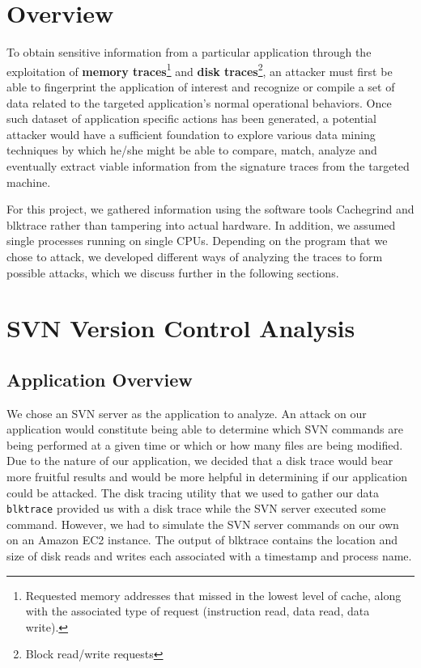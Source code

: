 \documentclass[11pt, oneside]{article}
\begin{document}
\section{Overview}
To obtain sensitive information from a particular application through the 
exploitation of \textbf{memory traces}\footnote{Requested memory addresses 
that missed in the lowest level of cache, along with the associated type of 
request (instruction read, data read, data write).} and 
\textbf{disk traces}\footnote{Block read/write requests}, an attacker must 
first be able to fingerprint the application of interest and recognize or 
compile a set of data related to the targeted application's normal operational 
behaviors. Once such dataset of application specific actions has been 
generated, a potential attacker would have a sufficient foundation to explore 
various data mining techniques by which he/she might be able to compare, 
match, analyze and eventually extract viable information from the signature 
traces from the targeted machine.

For this project, we gathered information using the software tools Cachegrind
and blktrace rather than tampering into actual hardware. In addition, we 
assumed single processes running on single CPUs. Depending on the program that 
we chose to attack, we developed different ways of analyzing the traces to
form possible attacks, which we discuss further in the following sections.


\section{SVN Version Control Analysis}
\subsection{Application Overview}
We chose an SVN server as the application to analyze.  An attack on our 
application would constitute being able to determine which SVN commands are 
being performed at a given time or which or how many files are being modified. 
Due to the nature of our application, we decided that a disk trace would bear 
more fruitful results and would be more helpful in determining if our 
application could be attacked. The disk tracing utility that we used to gather 
our data {\tt blktrace} provided us with a disk trace while the SVN server 
executed some command.  However, we had to simulate the SVN server commands on 
our own on an Amazon EC2 instance. The output of blktrace contains the 
location and size of disk reads and writes each associated with a timestamp 
and process name.
\end{document}
